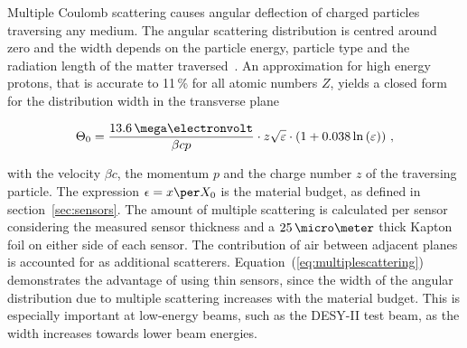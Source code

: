 % 
%
%
%
%
%
Multiple Coulomb scattering causes angular deflection of charged particles traversing any medium.
The angular scattering distribution is centred around zero
 and the width depends on the particle energy, particle type and the radiation length of the matter traversed~\cite{ref:scatteringhighland}.
An approximation for high energy protons, that is accurate to 11\,\% for all atomic numbers $Z$, yields a closed form for the distribution width in the transverse plane~\cite{ref:PDG-2014}

\begin{equation}
\label{eq:multiplescattering}
\Theta_{0} = \frac{13.6\,\mega\electronvolt}{\beta c p} \cdot z
\sqrt{\varepsilon}
\cdot \left( 1 + 0.038 \ln{\left( \varepsilon \right) } \right) \,,
\end{equation}

\noindent with the velocity $\beta c$, the momentum $p$ and the charge number $z$ of the traversing particle. 
The expression $\epsilon = x \per X_0$ is the material budget, as defined in section~\ref{sec:sensors}.
The amount of multiple scattering is calculated per sensor considering the measured sensor thickness and a $25\,\micro\meter$ thick Kapton foil on either side of each sensor.
The contribution of air between adjacent planes is accounted for as additional scatterers. 
Equation~(\ref{eq:multiplescattering}) demonstrates the advantage of using thin sensors, since the width of the angular distribution due to multiple scattering increases with the material budget.
This is especially important at low-energy beams, such as the DESY-II test beam, as the width increases towards lower beam energies.


